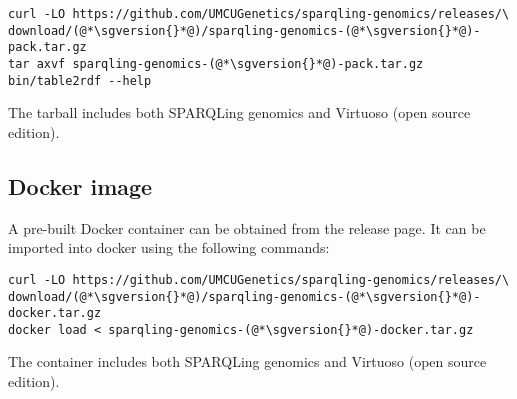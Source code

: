 \begin{siderules}
\begin{lstlisting}
curl -LO https://github.com/UMCUGenetics/sparqling-genomics/releases/\
download/(@*\sgversion{}*@)/sparqling-genomics-(@*\sgversion{}*@)-pack.tar.gz
tar axvf sparqling-genomics-(@*\sgversion{}*@)-pack.tar.gz
bin/table2rdf --help
\end{lstlisting}
\end{siderules}

  The tarball includes both SPARQLing genomics and Virtuoso (open source
  edition).

\subsection{Docker image}

  A pre-built Docker container can be obtained from the release page.  It
  can be imported into docker using the following commands:

\begin{siderules}
\begin{lstlisting}
curl -LO https://github.com/UMCUGenetics/sparqling-genomics/releases/\
download/(@*\sgversion{}*@)/sparqling-genomics-(@*\sgversion{}*@)-docker.tar.gz
docker load < sparqling-genomics-(@*\sgversion{}*@)-docker.tar.gz
\end{lstlisting}
\end{siderules}

  The container includes both SPARQLing genomics and Virtuoso (open source
  edition).

